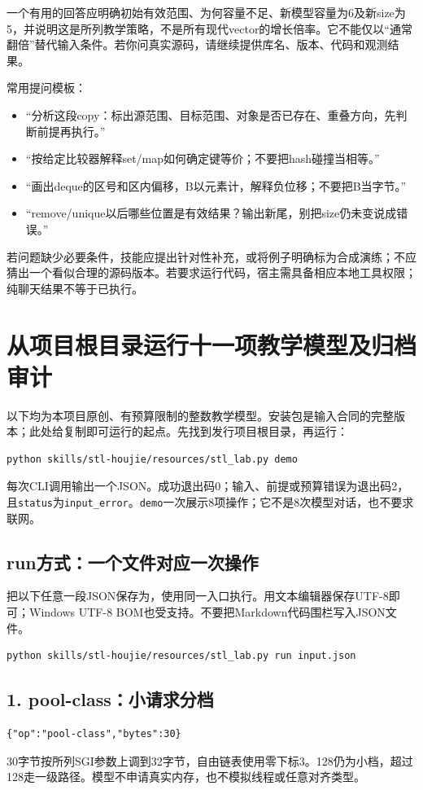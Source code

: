 \documentclass[11pt,a4paper,fontset=fandol]{ctexart}
\begin{document}
一个有用的回答应明确初始有效范围、为何容量不足、新模型容量为6及新size为5，并说明这是所列教学策略，不是所有现代vector的增长倍率。它不能仅以“通常翻倍”替代输入条件。若你问真实源码，请继续提供库名、版本、代码和观测结果。

常用提问模板：
\begin{itemize}
\item “分析这段copy：标出源范围、目标范围、对象是否已存在、重叠方向，先判断前提再执行。”
\item “按给定比较器解释set/map如何确定键等价；不要把hash碰撞当相等。”
\item “画出deque的区号和区内偏移，B以元素计，解释负位移；不要把B当字节。”
\item “remove/unique以后哪些位置是有效结果？输出新尾，别把size仍未变说成错误。”
\end{itemize}
若问题缺少必要条件，技能应提出针对性补充，或将例子明确标为合成演练；不应猜出一个看似合理的源码版本。若要求运行代码，宿主需具备相应本地工具权限；纯聊天结果不等于已执行。
\section{从项目根目录运行十一项教学模型及归档审计}
以下均为本项目原创、有预算限制的整数教学模型。安装包是输入合同的完整版本；此处给复制即可运行的起点。先找到发行项目根目录，再运行：
\begin{lstlisting}
python skills/stl-houjie/resources/stl_lab.py demo
\end{lstlisting}
每次CLI调用输出一个JSON。成功退出码0；输入、前提或预算错误为退出码2，且\texttt{status}为\texttt{input\_error}。\texttt{demo}一次展示8项操作；它不是8次模型对话，也不要求联网。

\subsection{run方式：一个文件对应一次操作}
把以下任意一段JSON保存为，使用同一入口执行。用文本编辑器保存UTF-8即可；Windows UTF-8 BOM也受支持。不要把Markdown代码围栏写入JSON文件。
\begin{lstlisting}
python skills/stl-houjie/resources/stl_lab.py run input.json
\end{lstlisting}

\subsection{1. pool-class：小请求分档}
\begin{lstlisting}
{"op":"pool-class","bytes":30}
\end{lstlisting}
30字节按所列SGI参数上调到32字节，自由链表使用零下标3。128仍为小档，超过128走一级路径。模型不申请真实内存，也不模拟线程或任意对齐类型。
\end{document}

